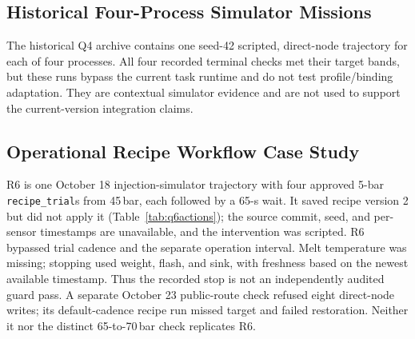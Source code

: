 \subsection{Historical Four-Process Simulator Missions}
\label{sec:scenarios}
The historical Q4 archive contains one seed-42 scripted, direct-node trajectory
for each of four processes. All four recorded terminal checks met their target
bands, but these runs bypass the current task runtime and do not test
profile/binding adaptation. They are contextual simulator evidence and are
not used to support the current-version integration claims.

\subsection{Operational Recipe Workflow Case Study}
\label{sec:recipeexperiment}
R6 is one October 18 injection-simulator trajectory with four approved
5-bar \texttt{recipe\_trial}s from 45\,bar, each followed by a 65-s wait.
It saved recipe version 2 but did not apply it (Table~\ref{tab:q6actions});
the source commit, seed, and per-sensor timestamps are unavailable, and the
intervention was scripted. R6 bypassed trial cadence and the separate
operation interval. Melt temperature was missing; stopping used weight,
flash, and sink, with freshness based on the newest available timestamp.
Thus the recorded stop is not an independently audited guard pass. A separate
October 23 public-route check refused eight direct-node writes; its
default-cadence recipe run missed target and failed restoration. Neither it
nor the distinct 65-to-70\,bar check replicates R6.
